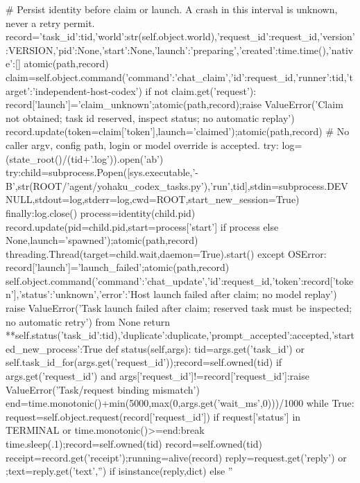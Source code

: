             # Persist identity before claim or launch. A crash in this interval is unknown, never a retry permit.
            record={'task_id':tid,'world':str(self.object.world),'request_id':request_id,'version':VERSION,'pid':None,'start':None,'launch':'preparing','created':time.time(),'native':[]}
            atomic(path,record)
            claim=self.object.command({'command':'chat_claim','id':request_id,'runner':tid,'target':'independent-host-codex'})
            if not claim.get('request'):
                record['launch']='claim_unknown';atomic(path,record);raise ValueError('Claim not obtained; task id reserved, inspect status; no automatic replay')
            record.update(token=claim['token'],launch='claimed');atomic(path,record)
            # No caller argv, config path, login or model override is accepted.
            try:
                log=(state_root()/(tid+'.log')).open('ab')
                try:child=subprocess.Popen([sys.executable,'-B',str(ROOT/'agent/yohaku_codex_tasks.py'),'run',tid],stdin=subprocess.DEVNULL,stdout=log,stderr=log,cwd=ROOT,start_new_session=True)
                finally:log.close()
                process=identity(child.pid)
                record.update(pid=child.pid,start=process['start'] if process else None,launch='spawned');atomic(path,record)
                threading.Thread(target=child.wait,daemon=True).start()
            except OSError:
                record['launch']='launch_failed';atomic(path,record)
                self.object.command({'command':'chat_update','id':request_id,'token':record['token'],'status':'unknown','error':'Host launch failed after claim; no model replay'})
                raise ValueError('Task launch failed after claim; reserved task must be inspected; no automatic retry') from None
        return {**self.status({'task_id':tid}),'duplicate':duplicate,'prompt_accepted':accepted,'started_new_process':True}
    def status(self,args):
        tid=args.get('task_id') or self.task_id_for(args.get('request_id'));record=self.owned(tid)
        if args.get('request_id') and args['request_id']!=record['request_id']:raise ValueError('Task/request binding mismatch')
        end=time.monotonic()+min(5000,max(0,args.get('wait_ms',0)))/1000
        while True:
            request=self.object.request(record['request_id'])
            if request['status'] in TERMINAL or time.monotonic()>=end:break
            time.sleep(.1);record=self.owned(tid)
        record=self.owned(tid)
        receipt=record.get('receipt');running=alive(record)
        reply=request.get('reply') or {};text=reply.get('text','') if isinstance(reply,dict) else ''

